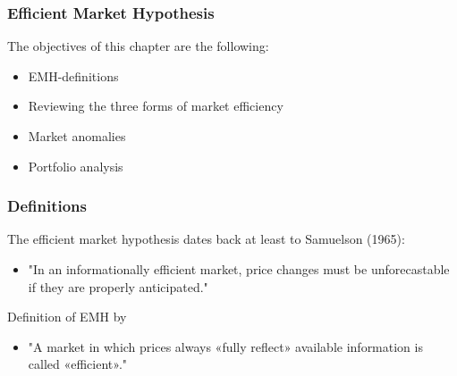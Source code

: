 \documentclass[xcolor=dvipsnames, english, 8pt]{beamer}
\begin{document}
\begin{frame}
    \frametitle{Efficient Market Hypothesis}
    The objectives of this chapter are the following:\vspace{0.25cm}\\
    \begin{itemize}
        \item EMH-definitions
        \item Reviewing the three forms of market efficiency
        \item Market anomalies
        \item Portfolio analysis
    \end{itemize}
\end{frame}

\begin{frame}
    \frametitle{Definitions}
    The {\color{ubRed}efficient market hypothesis} dates back at least to Samuelson (1965): \vspace{0.25cm}\\
    \begin{itemize}
        \item "In an informationally efficient market, price changes must be unforecastable
if they are properly anticipated."\vspace{0.25cm}\\
    \end{itemize}
    Definition of EMH by \cite{Fama1970}\vspace{0.25cm}\\
    \begin{itemize}
        \item "A market in which prices always «fully reflect» available information is
called «efficient»."\vspace{0.25cm}\\
    \end{itemize}
\end{frame}
\end{document}
